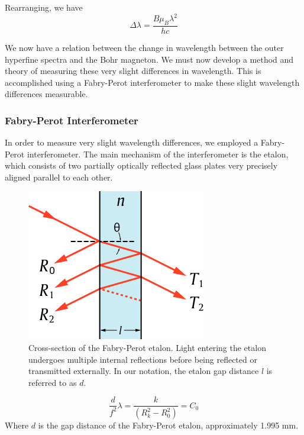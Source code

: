 \documentclass[twocolumn]{article}
\begin{document}
			Rearranging, we have
			\begin{equation}
				\Delta\lambda = \frac{B\mu_B\lambda^2}{hc}
			\end{equation}
			
			We now have a relation between the change in wavelength between the outer hyperfine spectra and the Bohr magneton.
			We must now develop a method and theory of measuring these very slight differences in wavelength.
			This is accomplished using a Fabry-Perot interferometer to make these slight wavelength differences measurable.
			
			\subsubsection{Fabry-Perot Interferometer}
				In order to measure very slight wavelength differences, we employed a Fabry-Perot interferometer.
				The main mechanism of the interferometer is the etalon, which consists of two partially optically reflected glass plates very precisely aligned parallel to each other.
				
				\begin{figure}
					\centering
					\includegraphics[width=0.7\linewidth]{Images/EtalonDiagram}
					\caption{Cross-section of the Fabry-Perot etalon. Light entering the etalon undergoes multiple internal reflections before being reflected or transmitted externally. In our notation, the etalon gap distance $l$ is referred to as $d$.\cite{stigmatella_aurantiaca_file:etalon-2.svg_2012}}
					\label{fig:EtalonDiagram}
				\end{figure}

				\begin{equation}
					\frac{d}{f^2}\lambda = \frac{k}{\left(R_k^2 - R_0^2 \right)} = C_0
					\label{eq:ConstantEq}
				\end{equation}
				Where $d$ is the gap distance of the Fabry-Perot etalon, approximately 1.995 mm.
			
\end{document}
